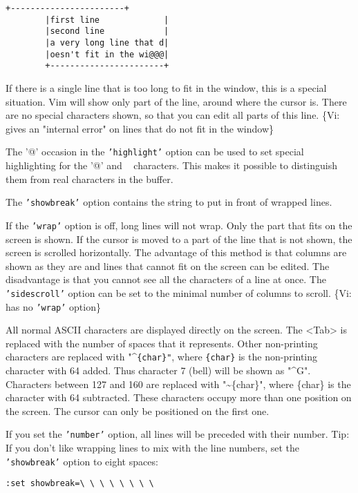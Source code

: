 \begin{Verbatim}[samepage=true]
		+-----------------------+
		|first line             |
		|second line            |
		|a very long line that d|
		|oesn't fit in the wi@@@|
		+-----------------------+
\end{Verbatim}

If there is a single line that is too long to fit in the window, this is a special situation.
Vim will show only part of the line, around where the cursor is.
There are no special characters shown, so that you can edit all parts of this line.
\{Vi: gives an "internal error" on lines that do not fit in the window\}

The '@' occasion in the \texttt{'highlight'} option can be used to set special highlighting for the '@' and \texttt{~} characters.
This makes it possible to distinguish them from real characters in the buffer.

The \texttt{'showbreak'} option contains the string to put in front of wrapped lines.

\label{wrap-off}
If the \texttt{'wrap'} option is off, long lines will not wrap.
Only the part that fits on the screen is shown.
If the cursor is moved to a part of the line that is not shown, the screen is scrolled horizontally.
The advantage of this method is that columns are shown as they are and lines that cannot fit on the screen can be edited.
The disadvantage is that you cannot see all the characters of a line at once.
The \texttt{'sidescroll'} option can be set to the minimal number of columns to scroll.
\{Vi: has no \texttt{'wrap'} option\}

All normal ASCII characters are displayed directly on the screen.
The <Tab> is replaced with the number of spaces that it represents.
Other non-printing characters are replaced with "\textasciicircum \texttt{\{char\}"}, where \texttt{\{char\}} is the non-printing character with 64 added.
Thus character 7 (bell) will be shown as "\textasciicircum G".
Characters between 127 and 160 are replaced with "\textasciitilde \{char\}", where \{char\} is the character with 64 subtracted.
These characters occupy more than one position on the screen.
The cursor can only be positioned on the first one.

 If you set the \texttt{'number'} option, all lines will be preceded with their
 number.  Tip: If you don't like wrapping lines to mix with the line numbers,
 set the \texttt{'showbreak'} option to eight spaces:
\begin{Verbatim}[samepage=true]
		:set showbreak=\ \ \ \ \ \ \ \ 
\end{Verbatim}

